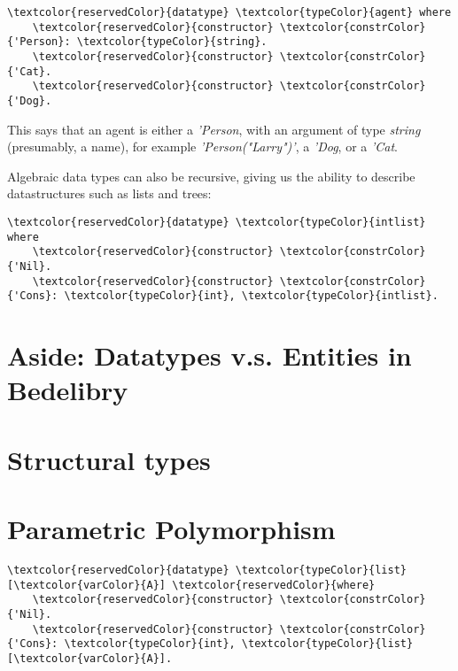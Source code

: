 \documentclass{book}
\begin{document}
\begin{Verbatim}[commandchars=\\\{\}]
  \textcolor{reservedColor}{datatype} \textcolor{typeColor}{agent} where
    \textcolor{reservedColor}{constructor} \textcolor{constrColor}{'Person}: \textcolor{typeColor}{string}.
    \textcolor{reservedColor}{constructor} \textcolor{constrColor}{'Cat}.
    \textcolor{reservedColor}{constructor} \textcolor{constrColor}{'Dog}.
\end{Verbatim}

\noindent This says that an agent is either a \textit{'Person}, with an argument of type \textit{string} (presumably, a name), for example \textit{'Person("Larry")'}, a \textit{'Dog}, or a \textit{'Cat}.

Algebraic data types can also be recursive, giving us the ability to describe datastructures such as lists and trees:

\begin{Verbatim}[commandchars=\\\{\}]
  \textcolor{reservedColor}{datatype} \textcolor{typeColor}{intlist} where
    \textcolor{reservedColor}{constructor} \textcolor{constrColor}{'Nil}.
    \textcolor{reservedColor}{constructor} \textcolor{constrColor}{'Cons}: \textcolor{typeColor}{int}, \textcolor{typeColor}{intlist}.
\end{Verbatim}

\section{Aside: Datatypes v.s. Entities in Bedelibry}



\section{Structural types}

\section{Parametric Polymorphism}

\begin{Verbatim}[commandchars=\\\{\}]
  \textcolor{reservedColor}{datatype} \textcolor{typeColor}{list}[\textcolor{varColor}{A}] \textcolor{reservedColor}{where}
    \textcolor{reservedColor}{constructor} \textcolor{constrColor}{'Nil}.
    \textcolor{reservedColor}{constructor} \textcolor{constrColor}{'Cons}: \textcolor{typeColor}{int}, \textcolor{typeColor}{list}[\textcolor{varColor}{A}].
\end{Verbatim}
\end{document}
